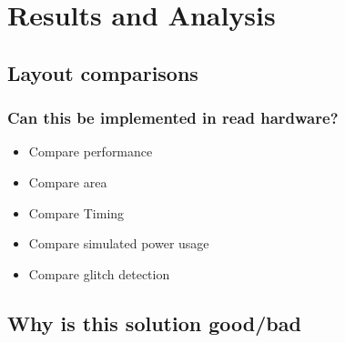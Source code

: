 \chapter{Results and Analysis}
\label{chap5}

\section{Layout comparisons}

\subsection{Can this be implemented in read hardware?}
\begin{itemize}
    \item Compare performance 
    \item Compare area
    \item Compare Timing 
    \item Compare simulated power usage
    \item Compare glitch detection
\end{itemize}

\section{Why is this solution good/bad}


